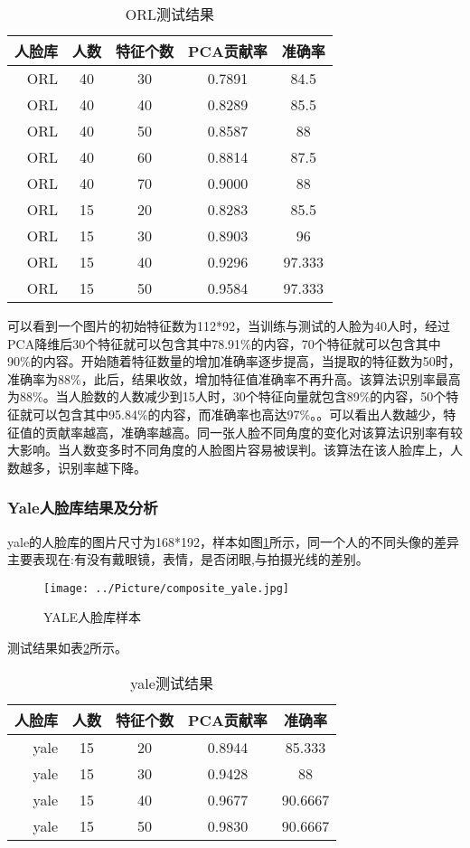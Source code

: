 \documentclass[a4paper,12pt]{ctexart}
\begin{document}
\begin{table}[!htb]
  \centering
\begin{tabular}{|r|c|c|c|c|}
\hline
人脸库&人数&特征个数&PCA贡献率&准确率\\
\hline
ORL&    40&     30&     0.7891& 84.5\\
ORL&    40&     40&     0.8289& 85.5\\
ORL&    40&     50&     0.8587& 88\\
ORL&    40&     60&     0.8814& 87.5\\
  ORL&    40&     70&     0.9000& 88\\
  \hline
ORL&    15&     20&     0.8283  &85.5\\
ORL&    15&     30&     0.8903  &96\\
ORL&    15&     40&     0.9296  &97.333\\
ORL&    15&     50&     0.9584  &97.333\\
  \hline
\end{tabular}
  \caption{ORL测试结果}
  \label{tab:orl}
\end{table}

可以看到一个图片的初始特征数为112*92，当训练与测试的人脸为40人时，经过PCA降维后30个特征就可以包含其中78.91\%的内容，70个特征就可以包含其中90\%的内容。开始随着特征数量的增加准确率逐步提高，当提取的特征数为50时，准确率为88\%，此后，结果收敛，增加特征值准确率不再升高。该算法识别率最高为88\%。当人脸数的人数减少到15人时，30个特征向量就包含89\%的内容，50个特征就可以包含其中95.84\%的内容，而准确率也高达97\%。。可以看出人数越少，特征值的贡献率越高，准确率越高。同一张人脸不同角度的变化对该算法识别率有较大影响。当人数变多时不同角度的人脸图片容易被误判。该算法在该人脸库上，人数越多，识别率越下降。

\subsubsection{Yale人脸库结果及分析}

yale的人脸库的图片尺寸为168*192，样本如图\ref{pic:yale}所示，同一个人的不同头像的差异主要表现在:有没有戴眼镜，表情，是否闭眼,与拍摄光线的差别。

\begin{figure}[!htb]
  \centering
  \centerline{\texttt{[image: ../Picture/composite\_yale.jpg]}}
  \caption{YALE人脸库样本}
\label{pic:yale}
\end{figure}

测试结果如表\ref{tab:yale}所示。
\begin{table}[!htb]
  \centering
\begin{tabular}{|r|c|c|c|c|}
\hline
人脸库&人数&特征个数&PCA贡献率&准确率\\
\hline
yale&   15&     20&     0.8944& 85.333\\
yale&   15&     30&     0.9428& 88\\
yale&   15&     40&     0.9677& 90.6667\\
yale&   15&     50&     0.9830& 90.6667\\
  \hline
\end{tabular}
  \caption{yale测试结果}
  \label{tab:yale}
\end{table}
\end{document}
